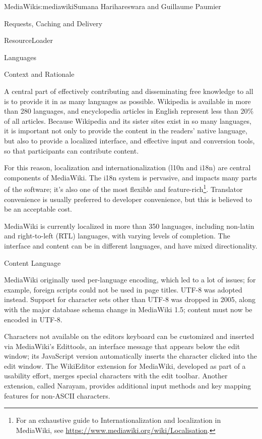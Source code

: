 \begin{aosachapter}{MediaWiki}{s:mediawiki}{Sumana Harihareswara and Guillaume Paumier}
\begin{aosasect1}{Requests, Caching and Delivery}
\begin{aosasect2}{ResourceLoader}
\end{aosasect2}

\end{aosasect1}

\begin{aosasect1}{Languages}

\begin{aosasect2}{Context and Rationale}

A central part of effectively contributing and disseminating free
knowledge to all is to provide it in as many languages as
possible. Wikipedia is available in more than 280 languages, and
encyclopedia articles in English represent less than 20\% of all
articles. Because Wikipedia and its sister sites exist in so many
languages, it is important not only to provide the content in the
readers' native language, but also to provide a localized interface,
and effective input and conversion tools, so that participants can
contribute content.

For this reason, localization and internationalization (l10n and
i18n) are central components of MediaWiki. The i18n system is
pervasive, and impacts many parts of the software; it's also one of
the most flexible and feature-rich\footnote{For an exhaustive guide to
  Internationalization and localization in MediaWiki, see
  \url{https://www.mediawiki.org/wiki/Localisation}.}. Translator
convenience is usually preferred to developer convenience, but this is
believed to be an acceptable cost.

MediaWiki is currently localized in more than 350 languages, including
non-latin and right-to-left (RTL) languages, with varying levels of
completion. The interface and content can be in different languages,
and have mixed directionality.

\end{aosasect2}

\begin{aosasect2}{Content Language}

MediaWiki originally used per-language encoding, which led to a lot of
issues; for example, foreign scripts could not be used in page
titles. UTF-8 was adopted instead. Support for character sets other
than UTF-8 was dropped in 2005, along with the major database schema
change in MediaWiki 1.5; content must now be encoded in UTF-8.

Characters not available on the editors keyboard can be customized and
inserted via MediaWiki's Edittools, an interface message that appears
below the edit window; its JavaScript version automatically inserts
the character clicked into the edit window. The WikiEditor extension
for MediaWiki, developed as part of a usability effort, merges special
characters with the edit toolbar. Another extension, called Narayam,
provides additional input methods and key mapping features for
non-ASCII characters.


\end{aosasect2}
\end{aosasect1}
\end{aosachapter}
